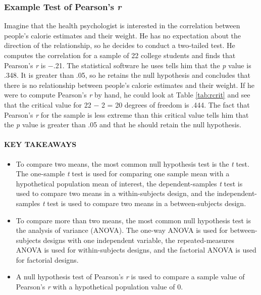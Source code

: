 \documentclass[
]{krantz}
\providecommand{\tightlist}{%
  \setlength{\itemsep}{0pt}\setlength{\parskip}{0pt}}
\begin{document}
\hypertarget{example-test-of-pearsons-r}{%
\subsubsection*{\texorpdfstring{Example Test of Pearson's \emph{r}}{Example Test of Pearson's r}}\label{example-test-of-pearsons-r}}


Imagine that the health psychologist is interested in the correlation between people's calorie estimates and their weight. He has no expectation about the direction of the relationship, so he decides to conduct a two-tailed test. He computes the correlation for a sample of 22 college students and finds that Pearson's \emph{r} is −.21. The statistical software he uses tells him that the \emph{p} value is .348. It is greater than .05, so he retains the null hypothesis and concludes that there is no relationship between people's calorie estimates and their weight. If he were to compute Pearson's \emph{r} by hand, he could look at Table \ref{tab:rcrit} and see that the critical value for 22 − 2 = 20 degrees of freedom is .444. The fact that Pearson's \emph{r} for the sample is less extreme than this critical value tells him that the \emph{p} value is greater than .05 and that he should retain the null hypothesis.

\hypertarget{key-takeaways-39}{%
\paragraph*{KEY TAKEAWAYS}\label{key-takeaways-39}}

\begin{itemize}
\tightlist
\item
  To compare two means, the most common null hypothesis test is the \emph{t} test. The one-sample \emph{t} test is used for comparing one sample mean with a hypothetical population mean of interest, the dependent-samples \emph{t} test is used to compare two means in a within-subjects design, and the independent-samples \emph{t} test is used to compare two means in a between-subjects design.
\item
  To compare more than two means, the most common null hypothesis test is the analysis of variance (ANOVA). The one-way ANOVA is used for between-subjects designs with one independent variable, the repeated-measures ANOVA is used for within-subjects designs, and the factorial ANOVA is used for factorial designs.
\item
  A null hypothesis test of Pearson's \emph{r} is used to compare a sample value of Pearson's \emph{r} with a hypothetical population value of 0.
\end{itemize}
\end{document}
